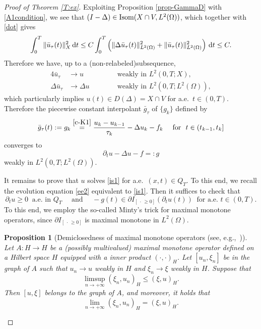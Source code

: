 \documentclass[reqno,10pt]{amsart}
\newtheorem{Prop}[Th]{Proposition}
\begin{document}
\begin{proof}[Proof of Theorem \ref{T:ex}]
Exploiting Proposition \ref{prop-GammaD} with \eqref{A1condition}, we
see that $(I - \Delta) \in {\mbox{\rm Isom}}(X \cap V , L^2(\Omega))$, which
together with \eqref{dot} gives
$$
\int^T_0 \|\bar u_\tau(t)\|_{X}^2 \, {\text{\rm d}} t
\leq C \int^T_0 \left(
\|\Delta \bar u_\tau(t)\|_{L^2(\Omega)}^2
+ \|\bar u_\tau(t)\|_{L^2(\Omega)}^2 
\right)\, {\text{\rm d}} t
\leq C.
$$
Therefore we have, up to a (non-relabeled)subsequence,
\begin{alignat*}{4}
 \bar u_\tau &\to u \qquad &&\mbox{ weakly in } L^2(0,T;X),\\
 \Delta \bar u_\tau &\to \Delta u \qquad &&\mbox{ weakly in }
 L^2(0,T;L^2(\Omega)),
\end{alignat*}
which particularly implies $u(t) \in D(\Delta) = X \cap V$ for a.e.~$t
\in (0,T)$. Therefore the piecewise constant interpolant
$\bar g_\tau$ of $\{g_k\}$ defined by
$$
\bar g_\tau(t) := g_k \stackrel{\eqref{c-K1}}= \dfrac{u_k - u_{k-1}}{\tau_k} - \Delta u_k - f_k
 \quad \mbox{ for } \ t \in (t_{k-1},t_k]
$$
converges to
\begin{equation}\label{g}
\partial_t u - \Delta u - f =: g
\end{equation}
weakly in $L^2(0,T;L^2(\Omega))$.

It remains to prove that $u$ solves \eqref{is1} for
a.e.~$(x,t) \in Q_T$. To this end, we recall the
evolution equation \eqref{ee2} equivalent to \eqref{is1}. Then it
suffices to check that
$$
\partial_t u \geq 0 \ \mbox{ a.e.~in } Q_T \quad \mbox{ and } \quad
-g(t) \in \partial {I_{[~\cdot\, \geq 0]}}(\partial_t u(t)) \ \mbox{ for a.e.~} t \in (0,T).
$$
To this end, we employ the so-called Minty's trick for maximal monotone
operators, since $\partial {I_{[~\cdot\, \geq 0]}}$ is maximal monotone in $L^2(\Omega)$.
\begin{Prop}[Demiclosedness of maximal monotone operators (see, e.g.,~\cite{Bre73,BCP,B})]\label{P:demiclo}
 Let $A : H \to H$ be a {\rm (}possibly multivalued{\rm )} maximal
 monotone operator defined on a Hilbert space $H$ equipped with a inner
 product $(\cdot,\cdot)_H$. Let $[u_n,\xi_n]$ be
 in the graph of $A$ such that $u_n \to u$ weakly in $H$ and $\xi_n \to
 \xi$ weakly in $H$. Suppose that 
$$
\limsup_{n \to +\infty} ( \xi_n, u_n )_H \leq ( \xi, u )_H. 
$$
Then $[u,\xi]$ belongs to the graph of $A$, and moreover, it holds that
$$
\lim_{n \to +\infty} ( \xi_n, u_n )_H = ( \xi, u )_H. 
$$
\end{Prop}


\end{proof}
\end{document}
